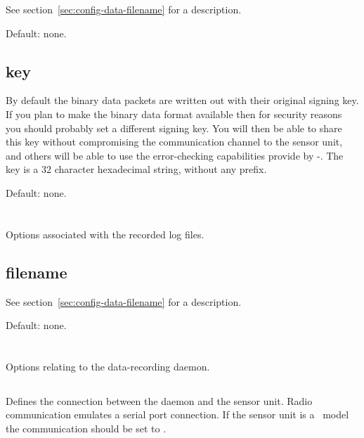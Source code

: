 See section~\ref{sec:config-data-filename} for a description.

Default: none.


\subsection{key}
By default the binary data packets are written out with their original signing
key. If you plan to make the binary data format available then for security
reasons you should probably set a different signing key. You will then be able
to share this key without compromising the communication channel to the sensor
unit, and others will be able to use the error-checking capabilities provide by
\hmac-\mdfive. The key is a 32 character hexadecimal string, without any
 prefix.

Default: none.


\section{\code{[logfile]}}
Options associated with the recorded log files.

\subsection{filename}

See section~\ref{sec:config-data-filename} for a description.

Default: none.



\section{\code[daemon]}
Options relating to the data-recording daemon.

\subsection{}
Defines the connection between the daemon and the sensor unit. Radio
communication emulates a serial port connection. If the sensor unit is a \PoE\
model the communication should be set to .

